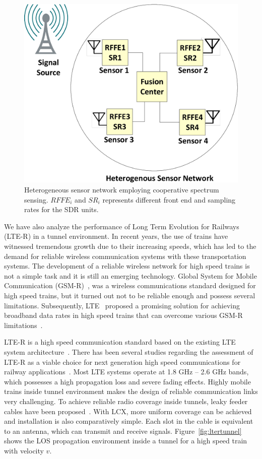 \begin{figure}[!ht]
\centering
\includegraphics[width=\textwidth,keepaspectratio]{images/Gill/figs/introdiag.eps} 
\caption{Heterogeneous sensor network employing cooperative spectrum sensing. $RFFE_i$ and $SR_i$ represents different front end and sampling rates for the SDR units.}
\label{fig:css}
\end{figure}

We have also analyze the performance of Long Term Evolution for Railways (LTE-R) in a tunnel environment. In recent years, the use of trains have witnessed tremendous growth due to their increasing speeds, which has led to the demand for reliable wireless communication systems with these transportation systems. The development of a reliable wireless network for high speed trains is not a simple task and it is still an emerging technology. Global System for Mobile Communication (GSM-R)~\cite{trlter1}, was a wireless communications standard designed for high speed trains, but it turned out not to be reliable enough and possess several limitations. Subsequently, LTE~\cite{trlter2} proposed a promising solution for achieving broadband data rates in high speed trains that can overcome various GSM-R limitations~\cite{arlter3,inplter4}. 

LTE-R is a high speed communication standard based on the existing LTE system architecture~\cite{inplter4}. There has been several studies regarding the assessment of LTE-R as a viable choice for next generation high speed communications for railway applications~\cite{inplter5,inplter6}. Most LTE systems operate at 1.8 GHz -- 2.6 GHz bands, which possesses a high propagation loss and severe fading effects. Highly mobile trains inside tunnel environment makes the design of reliable communication links very challenging. To achieve reliable radio coverage inside tunnels, leaky feeder cables have been proposed~\cite{arlter7}. With LCX, more uniform coverage can be achieved and installation is also comparatively simple. Each slot in the cable is equivalent to an antenna, which can transmit and receive signals. Figure~\ref{fig:ltertunnel} shows the LOS propagation environment inside a tunnel for a high speed train with velocity $v$.

